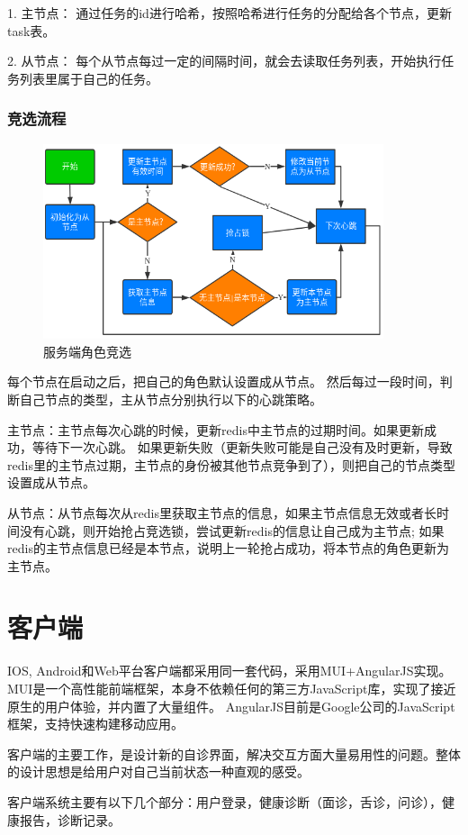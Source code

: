 1. 主节点： 通过任务的id进行哈希，按照哈希进行任务的分配给各个节点，更新task表。

2. 从节点： 每个从节点每过一定的间隔时间，就会去读取任务列表，开始执行任务列表里属于自己的任务。

\subsubsection{竞选流程}
\begin{figure}
    \centering
    \includegraphics[width=10cm]{images/slave-master.png}
    \caption{服务端角色竞选}
    \label{fig:slave_master}
\end{figure}
每个节点在启动之后，把自己的角色默认设置成从节点。
然后每过一段时间，判断自己节点的类型，主从节点分别执行以下的心跳策略。

主节点：主节点每次心跳的时候，更新redis中主节点的过期时间。如果更新成功，等待下一次心跳。 
如果更新失败（更新失败可能是自己没有及时更新，导致redis里的主节点过期，主节点的身份被其他节点竞争到了），则把自己的节点类型设置成从节点。

从节点：从节点每次从redis里获取主节点的信息，如果主节点信息无效或者长时间没有心跳，则开始抢占竞选锁，尝试更新redis的信息让自己成为主节点; 
如果redis的主节点信息已经是本节点，说明上一轮抢占成功，将本节点的角色更新为主节点。


\section{客户端}
IOS, Android和Web平台客户端都采用同一套代码，采用MUI+AngularJS实现。
MUI是一个高性能前端框架，本身不依赖任何的第三方JavaScript库，实现了接近原生的用户体验，并内置了大量组件。
AngularJS目前是Google公司的JavaScript框架，支持快速构建移动应用。

客户端的主要工作，是设计新的自诊界面，解决交互方面大量易用性的问题。整体的设计思想是给用户对自己当前状态一种直观的感受。

客户端系统主要有以下几个部分：用户登录，健康诊断（面诊，舌诊，问诊），健康报告，诊断记录。

